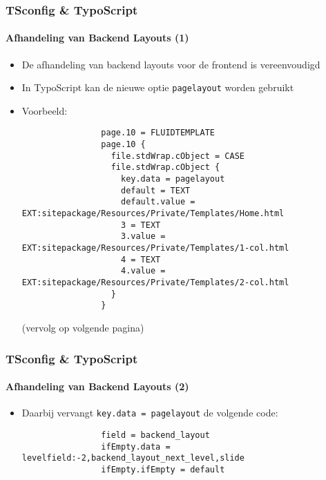 \begin{frame}[fragile]
	\frametitle{TSconfig \& TypoScript}
	\framesubtitle{Afhandeling van Backend Layouts (1)}

	\lstset{basicstyle=\tiny\ttfamily}

	\begin{itemize}

		\item De afhandeling van backend layouts voor de frontend is vereenvoudigd

		\item In TypoScript kan de nieuwe optie \texttt{pagelayout} worden gebruikt

		\item Voorbeeld:

			\begin{lstlisting}
				page.10 = FLUIDTEMPLATE
				page.10 {
				  file.stdWrap.cObject = CASE
				  file.stdWrap.cObject {
				    key.data = pagelayout
				    default = TEXT
				    default.value = EXT:sitepackage/Resources/Private/Templates/Home.html
				    3 = TEXT
				    3.value = EXT:sitepackage/Resources/Private/Templates/1-col.html
				    4 = TEXT
				    4.value = EXT:sitepackage/Resources/Private/Templates/2-col.html
				  }
				}
			\end{lstlisting}

			\smaller
				(vervolg op volgende pagina)
			\normalsize

	\end{itemize}

\end{frame}


\begin{frame}[fragile]
	\frametitle{TSconfig \& TypoScript}
	\framesubtitle{Afhandeling van Backend Layouts (2)}

	\lstset{basicstyle=\tiny\ttfamily}

	\begin{itemize}

		\item Daarbij vervangt \texttt{key.data = pagelayout} de volgende code:

			\begin{lstlisting}
				field = backend_layout
				ifEmpty.data = levelfield:-2,backend_layout_next_level,slide
				ifEmpty.ifEmpty = default
			\end{lstlisting}

	\end{itemize}

\end{frame}

